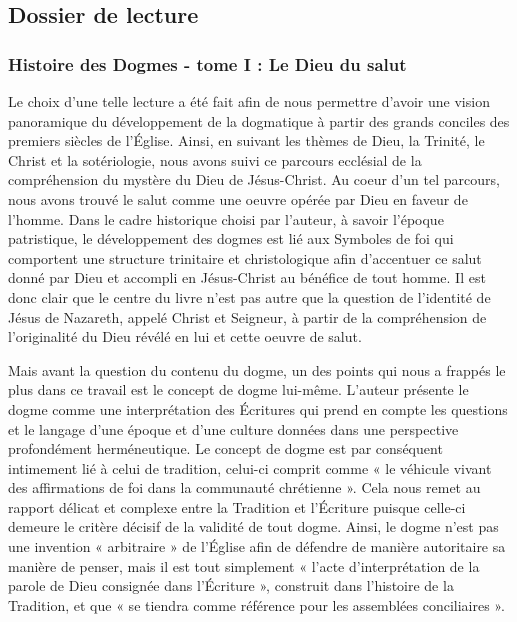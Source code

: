 \subsection*{Dossier de lecture}

\subsubsection*{Histoire des Dogmes - tome I : Le Dieu du salut}

Le choix d’une telle lecture a été fait afin de nous permettre d’avoir une vision panoramique du développement de la dogmatique à partir des grands conciles des premiers siècles de l’Église. Ainsi, en suivant les thèmes de Dieu, la Trinité, le Christ et la sotériologie, nous avons suivi ce parcours ecclésial de la compréhension du mystère du Dieu de Jésus-Christ. Au coeur d’un tel parcours, nous avons trouvé le salut comme une oeuvre opérée par Dieu en faveur de l’homme. Dans le cadre historique choisi par l’auteur, à savoir l’époque patristique, le développement des dogmes est lié aux Symboles de foi qui comportent une structure trinitaire et christologique afin d’accentuer ce salut donné par Dieu et accompli en Jésus-Christ au bénéfice de tout homme. Il est donc clair que le centre du livre n’est pas autre que la question de l’identité de Jésus de Nazareth, appelé Christ et Seigneur, à partir de la compréhension de l’originalité du Dieu révélé en lui et cette oeuvre de salut. 

Mais avant la question du contenu du dogme, un des points qui nous a frappés le plus dans ce travail est le concept de dogme lui-même. L’auteur présente le dogme comme une interprétation des Écritures qui prend en compte les questions et le langage d’une époque et d’une culture données dans une perspective profondément herméneutique. Le concept de dogme est par conséquent intimement lié à celui de tradition, celui-ci comprit comme « le véhicule vivant des affirmations de foi dans la communauté chrétienne ». Cela nous remet au rapport délicat et complexe entre la Tradition et l’Écriture puisque celle-ci demeure le critère décisif de la validité de tout dogme. Ainsi, le dogme n’est pas une invention « arbitraire » de l’Église afin de défendre de manière autoritaire sa manière de penser, mais il est tout simplement « l’acte d’interprétation de la parole de Dieu consignée dans l’Écriture », construit dans l’histoire de la Tradition, et que « se tiendra comme référence pour les assemblées conciliaires ». 

